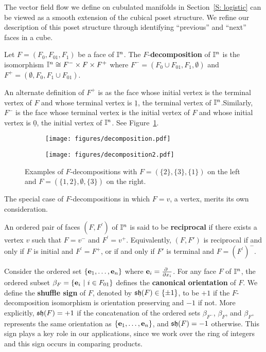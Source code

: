The vector field flow we define on cubulated manifolds in Section~\ref{S: logistic} can be viewed as a smooth extension of the cubical poset structure. 
We refine our description of this poset structure through identifying ``previous'' and ``next'' faces in a cube.

\begin{definition} \label{D: F decomposition}
	Let $F = (F_0, F_{01}, F_1)$ be a face of $\mathbb{I}^n$. The $F$-\textbf{decomposition} of $\mathbb{I}^n$ is the isomorphism $\mathbb{I}^n \cong F^- \times F \times F^+$ where $F^- = (F_0 \cup F_{01}, F_1, \emptyset)$ and $F^+ = (\emptyset, F_0, F_1 \cup F_{01})$.
\end{definition}

An alternate definition of $F^+$ is as the face whose initial vertex is the terminal vertex of $F$ and whose terminal vertex is $\underline{1}$, 
the terminal vertex of $\mathbb{I}^n$.Similarly, $F^-$ is the face whose terminal vertex is the initial vertex of $F$ and whose initial vertex is $\underline{0}$, the initial vertex of $\mathbb{I}^n$. See Figure~\ref{F: decomposition}.


\begin{figure}[h!]
	\begin{subfigure}[b]{0.35\textwidth}
		\centering
		\texttt{[image: figures/decomposition.pdf]}
	\end{subfigure}
	\begin{subfigure}[b]{0.35\textwidth}
		\centering
		\texttt{[image: figures/decomposition2.pdf]}
	\end{subfigure}
	\caption{Examples of $F$-decompositions with $F = (\{2\}, \{3\}, \{1\})$ on the left and $F = (\{1,2\}, \emptyset, \{3\})$ on the right.}
	\label{F: decomposition}
\end{figure}

The special case of $F$-decompositions in which $F = v$, a vertex, merits its own consideration.

\begin{definition}\label{D: reciprocal}
	An ordered pair of faces $(F,F^\prime)$ of $\mathbb{I}^n$ is said to be \textbf{reciprocal} if there exists a vertex $v$ such that $F = v^-$ and $F^\prime = v^+$. Equivalently, $(F, F')$ is reciprocal if and only if $F$ is initial and $F^\prime = F^+$, or if and only if $F'$ is terminal and $F = (F^{\prime})^-$.
\end{definition}

Consider the ordered set $\{\mathbf{e}_1, \dots, \mathbf{e}_n\}$ where $\e_i = \frac{\partial\ }{\partial x_i}$.
For any face $F$ of $\mathbb{I}^n$, the ordered subset $\beta_F = \{\mathbf{e}_i\ |\ i \in F_{01}\}$ defines the \textbf{canonical orientation} of $F$.
We define the \textbf{shuffle sign} of $F$, denoted by $\mathfrak{sh}(F) \in \{\pm 1\}$, to be $+1$ if the $F$-decomposition isomorphism is orientation preserving and $-1$ if not.
More explicitly, $\mathfrak{sh}(F) = +1$ if the concatenation of the ordered sets $\beta_{F^-}$, $\beta_{F}$, and $\beta_{F^+}$ represents the same orientation as $\{\mathbf{e}_1, \dots, \mathbf{e}_n\}$, and $\mathfrak{sh}(F) = -1$ otherwise.
This sign plays a key role in our applications, since we work over the ring of integers and this sign occurs in comparing products.

